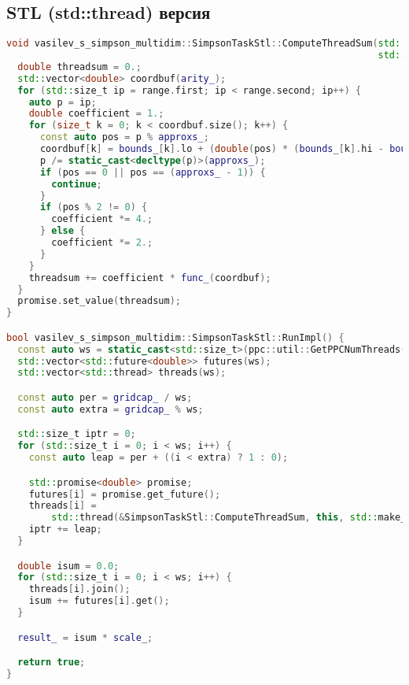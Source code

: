 \documentclass[14pt,a4paper]{extarticle}
\begin{document}
\subsection{STL (std::thread) версия}
\begin{lstlisting}[language=C++]
void vasilev_s_simpson_multidim::SimpsonTaskStl::ComputeThreadSum(std::pair<std::size_t, std::size_t> range,
                                                                  std::promise<double>&& promise) {
  double threadsum = 0.;
  std::vector<double> coordbuf(arity_);
  for (std::size_t ip = range.first; ip < range.second; ip++) {
    auto p = ip;
    double coefficient = 1.;
    for (size_t k = 0; k < coordbuf.size(); k++) {
      const auto pos = p % approxs_;
      coordbuf[k] = bounds_[k].lo + (double(pos) * (bounds_[k].hi - bounds_[k].lo) / double(approxs_));
      p /= static_cast<decltype(p)>(approxs_);
      if (pos == 0 || pos == (approxs_ - 1)) {
        continue;
      }
      if (pos % 2 != 0) {
        coefficient *= 4.;
      } else {
        coefficient *= 2.;
      }
    }
    threadsum += coefficient * func_(coordbuf);
  }
  promise.set_value(threadsum);
}

bool vasilev_s_simpson_multidim::SimpsonTaskStl::RunImpl() {
  const auto ws = static_cast<std::size_t>(ppc::util::GetPPCNumThreads());
  std::vector<std::future<double>> futures(ws);
  std::vector<std::thread> threads(ws);

  const auto per = gridcap_ / ws;
  const auto extra = gridcap_ % ws;

  std::size_t iptr = 0;
  for (std::size_t i = 0; i < ws; i++) {
    const auto leap = per + ((i < extra) ? 1 : 0);

    std::promise<double> promise;
    futures[i] = promise.get_future();
    threads[i] =
        std::thread(&SimpsonTaskStl::ComputeThreadSum, this, std::make_pair(iptr, iptr + leap), std::move(promise));
    iptr += leap;
  }

  double isum = 0.0;
  for (std::size_t i = 0; i < ws; i++) {
    threads[i].join();
    isum += futures[i].get();
  }

  result_ = isum * scale_;

  return true;
}
\end{lstlisting}

\newpage
\end{document}
